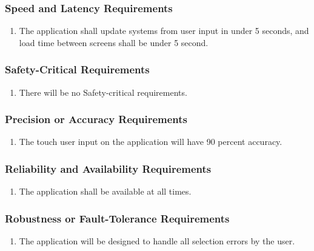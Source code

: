 \documentclass[12pt, titlepage]{article}
\begin{document}
\subsubsection{Speed and Latency Requirements}
\label{ssub:speed_and_latency_requirements}
\begin{enumerate}[{PR}1. ]
	\item The application shall update systems from user input in under 5 seconds, and load time between screens shall be under 5 second.
\end{enumerate}

\subsubsection{Safety-Critical Requirements}
\label{ssub:safety_critical_requirements}
\begin{enumerate}[{PR}1. ]
	\item There will be no Safety-critical requirements.
\end{enumerate}

\subsubsection{Precision or Accuracy Requirements}
\label{ssub:precision_or_accuracy_requirements}
\begin{enumerate}[{PR}1. ]
	\item The touch user input on the application will have 90 percent accuracy.
\end{enumerate}

\subsubsection{Reliability and Availability Requirements}
\label{ssub:reliability_and_availability_requirements}
\begin{enumerate}[{PR}1. ]
	\item The application shall be available at all times.
\end{enumerate}

\subsubsection{Robustness or Fault-Tolerance Requirements}
\label{ssub:robustness_or_fault_tolerance_requirements}
\begin{enumerate}[{PR}1. ]
	\item The application will be designed to handle all selection errors by the user.
\end{enumerate}
\end{document}
